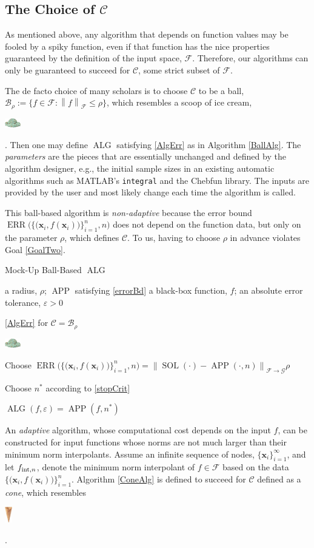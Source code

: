 \documentclass[11pt]{NSFamsart}
\DeclareMathOperator{\SOL}{SOL}
\DeclareMathOperator{\APP}{APP}
\DeclareMathOperator{\ALG}{ALG}
\DeclareMathOperator{\ERR}{ERR}
\newcommand{\bx}{{\boldsymbol{x}}}
\newcommand{\cc}{\mathcal{C}}
\newcommand{\cb}{\mathcal{B}}
\newcommand{\calc}{{\mathcal{C}}}
\newcommand{\calf}{{\mathcal{F}}}
\newcommand{\calg}{{\mathcal{G}}}
\newcommand{\norm}[2][{}]{\ensuremath{\left \lVert #2 \right \rVert}_{#1}}
\newcommand{\designInf}{\{\bx_i\}_{i=1}^\infty}
\newcommand{\dataN}{\bigl\{\bigl(\bx_i,f(\bx_i)\bigr)\bigr\}_{i=1}^n}
\newcommand{\ErrN}{\ERR\bigl(\dataN,n\bigr)}
\newcommand{\smallerscoop}{\parbox{0.7cm}{\includegraphics[width=0.7cm]{ProgramsImages/IceCreamScoop.eps}}\xspace}
\newcommand{\smallcone}{\parbox{0.7cm}{\includegraphics[width=0.32cm,angle=270]{ProgramsImages/MediumWaffleCone.eps}}\xspace}
\begin{document}
\subsection{The Choice of $\calc$} \label{sec:CChoice}
As mentioned above, any algorithm that depends on function values may be fooled by a spiky function, even if that function has the nice properties guaranteed by the definition of the input space, $\calf$.  Therefore, our algorithms can only be guaranteed to succeed for $\calc$, some strict subset of $\calf$. 

The de facto choice of many scholars is to choose $\calc$ to be a ball, $\cb_{\rho} := \{f \in \calf : \norm[\calf]{f} \le \rho \}$, which resembles a scoop of ice cream, \smallerscoop.  Then one may define $\ALG$ satisfying \eqref{AlgErr} as in Algorithm \ref{BallAlg}. The \emph{parameters} are the pieces that are essentially unchanged and defined by the algorithm designer, e.g., the initial sample sizes in an existing automatic algorithms such as MATLAB's \texttt{integral} and the Chebfun library.  The inputs are provided by the user and most likely change each time the algorithm is called.

This ball-based algorithm is \emph{non-adaptive} because the error bound $\ErrN$ does not depend on the function data, but only on the parameter $\rho$, which defines $\calc$.  To us, having to choose $\rho$ in advance violates Goal \ref{GoalTwo}.  

\begin{algorithm}
	\caption{Mock-Up Ball-Based $\ALG$ \label{BallAlg}} 
	\begin{algorithmic}
	\PARAM a radius, $\rho$; $\APP$ satisfying \eqref{errorBd}
		\INPUT a black-box function, $f$; an absolute error tolerance,
		$\varepsilon>0$

\Ensure \eqref{AlgErr} for $\cc = \cb_{\rho}$\smallerscoop

\State Choose $\ErrN = \norm[\calf \to \calg]{\SOL(\cdot) - \APP(\cdot,n)} \rho$ 

\State Choose $n^*$ according to \eqref{stopCrit}

\RETURN $\ALG(f,\varepsilon) = \APP(f,n^*)$
\end{algorithmic}
\end{algorithm}



An \emph{adaptive} algorithm, whose computational cost depends on the input $f$, can be constructed for input functions whose norms are not much larger than their minimum norm interpolants.  Assume an infinite sequence of nodes, $\designInf$, and let $f_{\textup{int},n}$, denote the minimum norm interpolant of $f \in \calf$ based on the data $\dataN$.  Algorithm \ref{ConeAlg} is defined to succeed for $\calc$ defined as a \emph{cone}, which resembles \smallcone.
\end{document}
